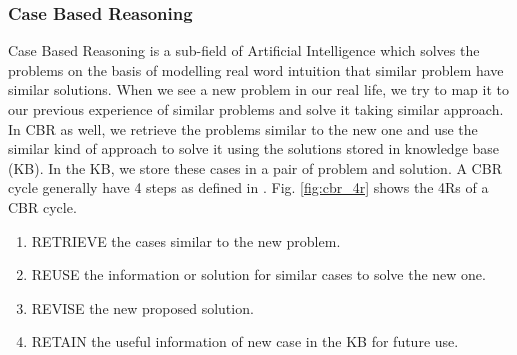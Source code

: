 

\subsubsection{Case Based Reasoning}
Case Based Reasoning is a sub-field of Artificial Intelligence which solves the problems on the basis of modelling real word intuition that similar problem have similar solutions. When we see a new problem in our real life, we try to map it to our previous experience of similar problems and solve it taking similar approach. In CBR as well, we retrieve the problems similar to the new one and use the similar kind of approach to solve it using the solutions stored in knowledge base (KB). In the KB, we store these cases in a pair of problem and solution. A CBR cycle generally have 4 steps as defined in \cite{aamodt1994case}. Fig. \ref{fig:cbr_4r} shows the 4Rs of a CBR cycle.

\begin{enumerate}
    \item RETRIEVE the cases similar to the new problem.
    \item REUSE the information or solution for similar cases to solve the new one.
    \item REVISE the new proposed solution.
    \item RETAIN the useful information of new case in the KB for future use.
\end{enumerate}


